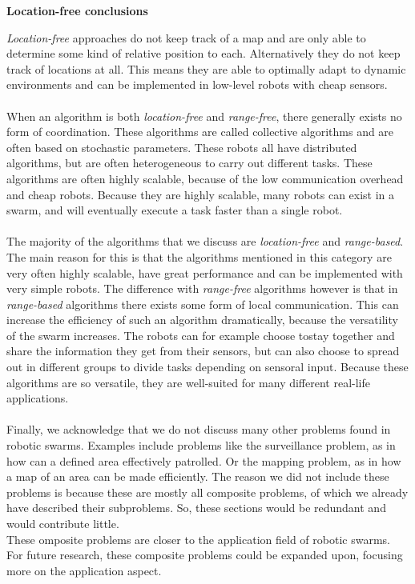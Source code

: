 \textbf{Location-free conclusions} 

\emph{Location-free} approaches do not keep track of a map and are only able to determine some kind of relative position to each.
Alternatively they do not keep track of locations at all. 
This means they are able to optimally adapt to dynamic environments and can be implemented in low-level robots with cheap sensors. \\
\\
When an algorithm is both \emph{location-free} and \emph{range-free}, there generally exists no form of coordination. 
These algorithms are called collective algorithms and are often based on stochastic parameters. 
These robots all have distributed algorithms, but are often heterogeneous to carry out different tasks.
These algorithms are often highly scalable, because of the low communication overhead and cheap robots. 
Because they are highly scalable, many robots can exist in a swarm, and will eventually execute a task faster than a single robot.\\
\\
The majority of the algorithms that we discuss are \emph{location-free} and \emph{range-based}.
The main reason for this is that the algorithms mentioned in this category are very often highly scalable, have great performance and can be implemented with very simple robots. 
The difference with \emph{range-free} algorithms however is that in \emph{range-based} algorithms there exists some form of local communication.
This can increase the efficiency of such an algorithm dramatically, because the versatility of the swarm increases.
The robots can for example choose tostay together and share the information they get from their sensors, but can also choose to spread out in different groups to divide tasks depending on sensoral input. 
Because these algorithms are so versatile, they are well-suited for many different real-life applications.\\
\\
Finally, we acknowledge that we do not discuss many other problems found in robotic swarms. 
Examples include problems like the surveillance problem, as in how can a defined area effectively patrolled. 
Or the mapping problem, as in how a map of an area can be made efficiently. 
The reason we did not include these problems is because these are mostly all composite problems, of which we already have described their subproblems.
So, these sections would be redundant and would contribute little. \\
These omposite problems are closer to the application field of robotic swarms.
For future research, these composite problems could be expanded upon, focusing more on the application aspect. 

